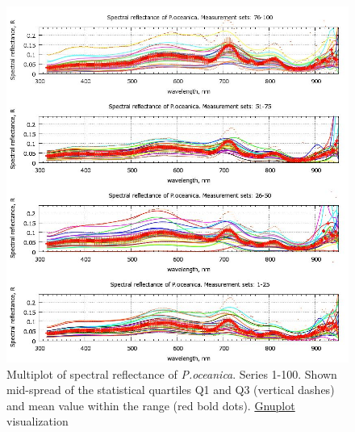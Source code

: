 \documentclass[10pt, a4paper]{article}
\begin{document}
\begin{figure}
	\begin{center}
		\includegraphics[scale=0.45]{GNU-13.jpg}
		\caption{Multiplot of spectral reflectance of \textit{P.oceanica}. Series 1-100. Shown mid-spread of the statistical quartiles Q1 and Q3 (vertical dashes) and
			mean value within the range (red bold dots). \href{http://www.gnuplot.info/}{Gnuplot} visualization­}
		\label{fig:4.13}
	\end{center}
\end{figure}
\end{document}
